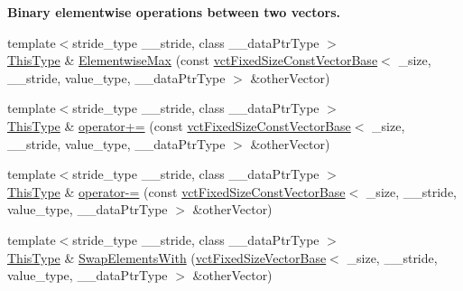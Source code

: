 \begin{Indent}{\bf Binary elementwise operations between two vectors.}
\begin{DoxyCompactItemize}
\item 
{\footnotesize template$<$stride\+\_\+type \+\_\+\+\_\+stride, class \+\_\+\+\_\+data\+Ptr\+Type $>$ }\\\hyperlink{classvct_fixed_size_const_vector_base_a071063bc4fa43112cc287b2dbef53180}{This\+Type} \& \hyperlink{classvct_fixed_size_vector_base_a4d59599557e4ac13451040ed04c9e858}{Elementwise\+Max} (const \hyperlink{classvct_fixed_size_const_vector_base}{vct\+Fixed\+Size\+Const\+Vector\+Base}$<$ \+\_\+size, \+\_\+\+\_\+stride, value\+\_\+type, \+\_\+\+\_\+data\+Ptr\+Type $>$ \&other\+Vector)
\item 
{\footnotesize template$<$stride\+\_\+type \+\_\+\+\_\+stride, class \+\_\+\+\_\+data\+Ptr\+Type $>$ }\\\hyperlink{classvct_fixed_size_const_vector_base_a071063bc4fa43112cc287b2dbef53180}{This\+Type} \& \hyperlink{classvct_fixed_size_vector_base_a6aa23ed49a0ba665318c8d90c9a1c90e}{operator+=} (const \hyperlink{classvct_fixed_size_const_vector_base}{vct\+Fixed\+Size\+Const\+Vector\+Base}$<$ \+\_\+size, \+\_\+\+\_\+stride, value\+\_\+type, \+\_\+\+\_\+data\+Ptr\+Type $>$ \&other\+Vector)
\item 
{\footnotesize template$<$stride\+\_\+type \+\_\+\+\_\+stride, class \+\_\+\+\_\+data\+Ptr\+Type $>$ }\\\hyperlink{classvct_fixed_size_const_vector_base_a071063bc4fa43112cc287b2dbef53180}{This\+Type} \& \hyperlink{classvct_fixed_size_vector_base_ad4dd5c63d761584d50ee702aa4a5393c}{operator-\/=} (const \hyperlink{classvct_fixed_size_const_vector_base}{vct\+Fixed\+Size\+Const\+Vector\+Base}$<$ \+\_\+size, \+\_\+\+\_\+stride, value\+\_\+type, \+\_\+\+\_\+data\+Ptr\+Type $>$ \&other\+Vector)
\item 
{\footnotesize template$<$stride\+\_\+type \+\_\+\+\_\+stride, class \+\_\+\+\_\+data\+Ptr\+Type $>$ }\\\hyperlink{classvct_fixed_size_const_vector_base_a071063bc4fa43112cc287b2dbef53180}{This\+Type} \& \hyperlink{classvct_fixed_size_vector_base_a8fe3d33f9d54a8ee457d8d4638765d61}{Swap\+Elements\+With} (\hyperlink{classvct_fixed_size_vector_base}{vct\+Fixed\+Size\+Vector\+Base}$<$ \+\_\+size, \+\_\+\+\_\+stride, value\+\_\+type, \+\_\+\+\_\+data\+Ptr\+Type $>$ \&other\+Vector)
\end{DoxyCompactItemize}
\end{Indent}
